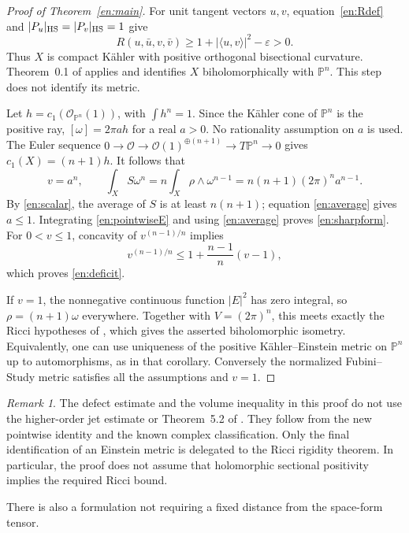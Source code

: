 \documentclass[12pt]{amsart}
\theoremstyle{definition}
\theoremstyle{remark}
\newtheorem{rem}[thm]{Remark}
\numberwithin{equation}{section}
\newcommand{\cO}{\mathcal{O}}
\theoremstyle{plain}
\theoremstyle{remark}
\theoremstyle{definition}
\begin{document}
\begin{proof}[Proof of Theorem~\ref{en:main}]
For unit tangent vectors $u,v$, equation~\eqref{en:Rdef} and
$|P_u|_{\rm HS}=|P_v|_{\rm HS}=1$ give
\[
 R(u,\bar u,v,\bar v)
 \geq1+|\langle u,v\rangle|^2-\varepsilon>0.
\]
Thus $X$ is compact K\"ahler with positive orthogonal bisectional
curvature. Theorem~0.1 of \cite{en:FLW} applies and identifies $X$
biholomorphically with $\mathbb P^n$. This step does not identify its metric.

Let $h=c_1(\cO_{\mathbb P^n}(1))$, with $\int h^n=1$. Since the K\"ahler
cone of $\mathbb P^n$ is the positive ray, $[\omega]=2\pi a h$ for a real
$a>0$. No rationality assumption on $a$ is used. The Euler sequence
$0\to\cO\to\cO(1)^{\oplus(n+1)}\to T\mathbb P^n\to0$
gives $c_1(X)=(n+1)h$. It follows that
\begin{equation}\label{en:average}
 v=a^n,\qquad
 \int_X S\omega^n
 =n\int_X\rho\wedge\omega^{n-1}
 =n(n+1)(2\pi)^n a^{n-1}.
\end{equation}
By \eqref{en:scalar}, the average of $S$ is at least $n(n+1)$; equation
\eqref{en:average} gives $a\leq1$. Integrating \eqref{en:pointwiseE}
and using \eqref{en:average} proves \eqref{en:sharpform}.
For $0<v\leq1$, concavity of $v^{(n-1)/n}$ implies
\[
 v^{(n-1)/n}\leq1+\frac{n-1}{n}(v-1),
\]
which proves \eqref{en:deficit}.

If $v=1$, the nonnegative continuous function $|E|^2$ has zero integral,
so $\rho=(n+1)\omega$ everywhere. Together with $V=(2\pi)^n$, this
meets exactly the Ricci hypotheses of \cite[Corollary 5.3(2)]{en:DS},
which gives the asserted biholomorphic isometry. Equivalently, one can
use uniqueness of the positive K\"ahler--Einstein metric on $\mathbb P^n$
up to automorphisms, as in that corollary. Conversely the normalized
Fubini--Study metric satisfies all the assumptions and $v=1$.
\end{proof}

\begin{rem}\label{en:dependencies}
The defect estimate and the volume inequality in this proof do not use
the higher-order jet estimate or Theorem~5.2 of \cite{en:DS}. They follow
from the new pointwise identity and the known complex classification.
Only the final identification of an Einstein metric is delegated to the
Ricci rigidity theorem. In particular, the proof does not assume that
holomorphic sectional positivity implies the required Ricci bound.
\end{rem}

There is also a formulation not requiring a fixed distance from the
space-form tensor.
\end{document}
